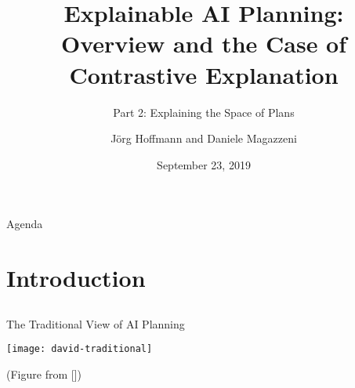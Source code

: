 




\title[Explainable AI Planning]{Explainable AI Planning:\\ Overview and the Case of Contrastive Explanation}

\subtitle{Part 2: Explaining the Space of Plans}

\author[Hoffmann and Magazzeni]{J\"org Hoffmann and Daniele Magazzeni}


\date{September 23, 2019}





\frame{\titlepage}

\begin{frame}{Agenda}
\tableofcontents
\end{frame}



%

\section[Introduction]{Introduction}
\subsection*{}

\begin{frame}{The Traditional View of AI Planning}

\centering

\medskip

\texttt{[image: david-traditional]}

\medskip

{\footnotesize (Figure from [\cite{smith:aaai-12}])}

\end{frame}


